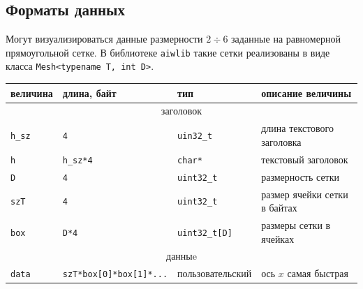 \documentclass[12pt]{article}
\begin{document}
\begin{enumrate}
\section{Форматы данных}
Могут визуализироваться данные размерности $2\div6$ заданные на равномерной прямоугольной сетке.
В библиотеке \verb'aiwlib' такие сетки реализованы в виде класса \verb'Mesh<typename T, int D>'. 

\begin{center}
\begin{tabular}{|p{}|p{}|p{}|p{}|}
\hline
величина & длина, байт & тип & описание величины \\
\hline
\multicolumn{4}{|c|}{заголовок \rule{0pt}{.6cm}}\\
\hline
{\tt h\_sz} & {\tt 4} & {\tt uin32\_t} & длина текстового заголовка \\
{\tt h} & {\tt h\_sz*4} & {\tt char*} & текстовый заголовок \\
{\tt D} & {\tt 4} & {\tt uint32\_t} & размерность сетки\\
{\tt szT} & {\tt 4} & {\tt uint32\_t} & размер ячейки сетки в байтах\\
{\tt box} & {\tt D*4} & {\tt uint32\_t[D]} & размеры сетки в ячейках\\
\hline
\multicolumn{4}{|c|}{данныe \rule{0pt}{.6cm}}\\
\hline
{\tt data} & {\tt szT*box[0]*box[1]*...} & пользовательский & ось $x$ самая быстрая \\
\hline
\end{tabular}
\end{center}


\end{enumrate}
\end{document}
